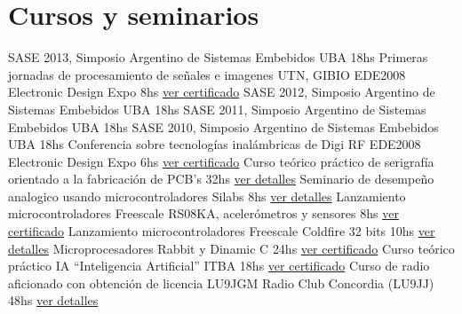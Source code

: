 \documentclass[11pt,a4paper,sans]{moderncv} 	%
\begin{document}
\section{Cursos y seminarios}
 		{SASE 2013, Simposio Argentino de Sistemas Embebidos}				{UBA} 						{18hs} 	{} 											{}{}
 		{Primeras jornadas de procesamiento de señales e imagenes}			{UTN, GIBIO EDE2008 Electronic Design Expo} 	{8hs}  	{\href{http://disenioconingenio.com.ar/producto.php?products_id=396}{ver certificado}} 	{}{}
 		{SASE 2012, Simposio Argentino de Sistemas Embebidos}				{UBA} 						{18hs} 	{} 											{}{}
 		{SASE 2011, Simposio Argentino de Sistemas Embebidos}				{UBA} 						{18hs} 	{} 											{}{}
 		{SASE 2010, Simposio Argentino de Sistemas Embebidos}				{UBA} 						{18hs} 	{} 											{}{}
 		{Conferencia sobre tecnologías inalámbricas de Digi RF}				{EDE2008 Electronic Design Expo} 		{6hs}  	{\href{http://disenioconingenio.com.ar/producto.php?products_id=394}{ver certificado}} 	{}{}
 		{Curso teórico práctico de serigrafía orientado a la fabricación de PCB's}	{32hs} 				 			{\href{http://disenioconingenio.com.ar/producto.php?products_id=389}{ver detalles}} 	{}{}
 		{Seminario de desempeño analogico usando microcontroladores Silabs}		{8hs} 				 			{\href{http://disenioconingenio.com.ar/producto.php?products_id=395}{ver detalles}} 	{}{}
 		{Lanzamiento microcontroladores Freescale RS08KA, acelerómetros y sensores} 	{8hs} 							{\href{http://disenioconingenio.com.ar/producto.php?products_id=384}{ver certificado}} 	{}{}
 		{Lanzamiento microcontroladores Freescale Coldfire 32 bits} 			{10hs}			 				{\href{http://disenioconingenio.com.ar/producto.php?products_id=385}{ver detalles}} 	{}{}
 		{Microprocesadores Rabbit y Dinamic C} 						{24hs}			 				{\href{http://disenioconingenio.com.ar/producto.php?products_id=386}{ver certificado}} 	{}{}
 		{Curso teórico práctico IA “Inteligencia Artificial”} 				{ITBA} 						{18hs} 	{\href{http://disenioconingenio.com.ar/producto.php?products_id=387}{ver certificado}} 	{}{}
 		{Curso de radio aficionado con obtención de licencia LU9JGM} 			{Radio Club Concordia (LU9JJ)} 			{48hs} 	{\href{http://disenioconingenio.com.ar/producto.php?products_id=388}{ver detalles}} 	{}{}
\end{document}
